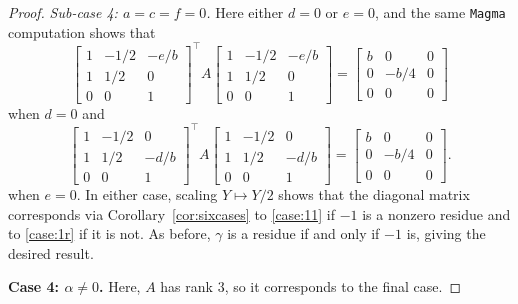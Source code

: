 \documentclass[10pt,a4paper]{amsart}
\numberwithin{equation}{section}
\numberwithin{figure}{section}
\numberwithin{table}{section}
\theoremstyle{definition}
\theoremstyle{plain}
\theoremstyle{remark}
\theoremstyle{plain}
\theoremstyle{definition}
\theoremstyle{plain}
\theoremstyle{plain}
\begin{document}
\begin{proof}
\emph{Sub-case 4: $a=c=f=0$.} Here either $d=0$ or $e=0$, and the same \texttt{Magma} computation shows that
		\begin{equation*}
		\begin{bmatrix}
		1 & -1/2 & -e/b\\
		1 & 1/2 & 0\\
		0 & 0 & 1
		\end{bmatrix}^\top\!
		A
		\begin{bmatrix}
		1 & -1/2 & -e/b\\
		1 & 1/2 & 0\\
		0 & 0 & 1
		\end{bmatrix}
		=
		\begin{bmatrix}
		b&0&0\\
		0&-b/4&0\\
		0&0&0
		\end{bmatrix}
\end{equation*}
when $d=0$ and
\begin{equation*}
		\begin{bmatrix}
		1 & -1/2 & 0\\
		1 & 1/2 & -d/b\\
		0 & 0 & 1
		\end{bmatrix}^\top\!
		A
		\begin{bmatrix}
		1 & -1/2 & 0\\
		1 & 1/2 & -d/b\\
		0 & 0 & 1
		\end{bmatrix}
		=
		\begin{bmatrix}
		b&0&0\\
		0&-b/4&0\\
		0&0&0
		\end{bmatrix}.
		\end{equation*}
when $e=0$.
		In either case, scaling $Y\mapsto Y/2$ shows that the diagonal matrix corresponds via Corollary~\ref{cor:sixcases} to \eqref{case:11} if $-1$ is a nonzero residue and to \eqref{case:1r} if it is not. As before, $\gamma$ is a residue if and only if $-1$ is, giving the desired result.

		\textbf{Case 4: $\alpha\ne 0$.} Here, $A$ has rank $3$, so it corresponds to the final case.
	\end{proof}
	
\end{document}
